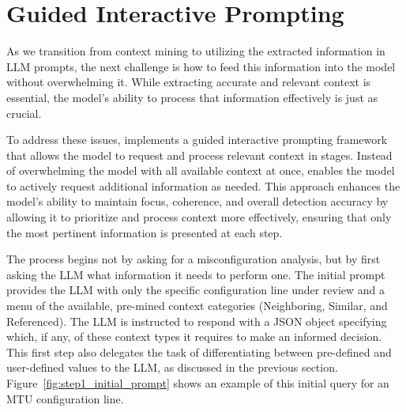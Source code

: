 \section{Guided Interactive Prompting}
\label{prompting_method}

As we transition from context mining to utilizing the extracted information in LLM prompts, the next challenge is how to feed this information into the model without overwhelming it. While extracting accurate and relevant context is essential, the model's ability to process that information effectively is just as crucial.

To address these issues, \sysname{} implements a guided interactive prompting framework that allows the model to request and process relevant context in stages. Instead of overwhelming the model with all available context at once, \sysname{} enables the model to actively request additional information as needed. This approach enhances the model’s ability to maintain focus, coherence, and overall detection accuracy by allowing it to prioritize and process context more effectively, ensuring that only the most pertinent information is presented at each step.

The process begins not by asking for a misconfiguration analysis, but by first asking the LLM what information it needs to perform one. The initial prompt provides the LLM with only the specific configuration line under review and a menu of the available, pre-mined context categories (Neighboring, Similar, and Referenced). The LLM is instructed to respond with a JSON object specifying which, if any, of these context types it requires to make an informed decision. This first step also delegates the task of differentiating between pre-defined and user-defined values to the LLM, as discussed in the previous section. Figure~\ref{fig:step1_initial_prompt} shows an example of this initial query for an MTU configuration line.


